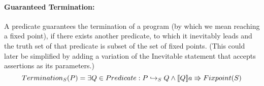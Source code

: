 \paragraph{Guaranteed Termination:}
A predicate guarantees the termination of a program (by which we mean reaching a fixed point), if there exists another predicate, to which it inevitably leads and the truth set of that predicate is subset of the set of fixed points.
(This could later be simplified by adding a variation of the Inevitable statement that accepts assertions as its parameters.)
\begin{equation}
    Termination_S(P) = \exists Q \in Predicate : P \hookrightarrow_S Q \land \llbracket Q \rrbracket a \Rrightarrow Fixpoint(S)
\end{equation}
\begin{code}
    \>[2]\AgdaSpace{}%
    \AgdaSymbol{:}\AgdaSpace{}%
    \AgdaSpace{}%
    \AgdaSpace{}%
    \AgdaSpace{}%
    \AgdaSpace{}%
    \<%
    \\
    \>[2]\AgdaSpace{}%
    \AgdaSpace{}%
    \AgdaSpace{}%
    \AgdaSymbol{=}\AgdaSpace{}%
    \AgdaSpace{}%
    \AgdaSpace{}%
    \AgdaSpace{}%
    \AgdaSpace{}%
    \AgdaSpace{}%
    \AgdaSymbol{(}\AgdaSpace{}%
    \AgdaOperator{\AgdaFunction{↪[}}\AgdaSpace{}%
    \AgdaSpace{}%
    \AgdaOperator{\AgdaFunction{]}}\AgdaSpace{}%
    \AgdaSpace{}%
    \AgdaSpace{}%
    \AgdaSpace{}%
    \AgdaSpace{}%
    \AgdaSpace{}%
    \AgdaSpace{}%
    \AgdaSpace{}%
    \AgdaSymbol{))}\<%
    \\
    \\[\AgdaEmptyExtraSkip]%
    \>[2]\AgdaSpace{}%
    \AgdaSpace{}%
    \<%
    \\
    \>[2]\AgdaSpace{}%
    \AgdaSymbol{:}\AgdaSpace{}%
    \AgdaSpace{}%
    \AgdaSpace{}%
    \AgdaSpace{}%
    \AgdaSpace{}%
    \<%
    \\
    \>[2]\AgdaSpace{}%
    \AgdaOperator{\AgdaFunction{∈TERM[}}\AgdaSpace{}%
    \AgdaSpace{}%
    \AgdaOperator{\AgdaFunction{]}}\AgdaSpace{}%
    \AgdaSymbol{=}\AgdaSpace{}%
    \AgdaSpace{}%
    \AgdaSpace{}%
    \<%
\end{code}

